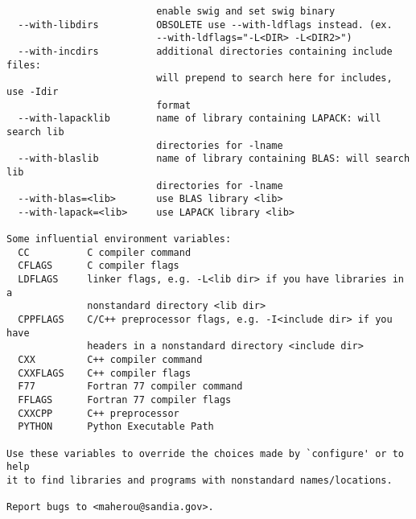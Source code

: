 \begin{verbatim}
                          enable swig and set swig binary
  --with-libdirs          OBSOLETE use --with-ldflags instead. (ex.
                          --with-ldflags="-L<DIR> -L<DIR2>")
  --with-incdirs          additional directories containing include files:
                          will prepend to search here for includes, use -Idir
                          format
  --with-lapacklib        name of library containing LAPACK: will search lib
                          directories for -lname
  --with-blaslib          name of library containing BLAS: will search lib
                          directories for -lname
  --with-blas=<lib>       use BLAS library <lib>
  --with-lapack=<lib>     use LAPACK library <lib>

Some influential environment variables:
  CC          C compiler command
  CFLAGS      C compiler flags
  LDFLAGS     linker flags, e.g. -L<lib dir> if you have libraries in a
              nonstandard directory <lib dir>
  CPPFLAGS    C/C++ preprocessor flags, e.g. -I<include dir> if you have
              headers in a nonstandard directory <include dir>
  CXX         C++ compiler command
  CXXFLAGS    C++ compiler flags
  F77         Fortran 77 compiler command
  FFLAGS      Fortran 77 compiler flags
  CXXCPP      C++ preprocessor
  PYTHON      Python Executable Path

Use these variables to override the choices made by `configure' or to help
it to find libraries and programs with nonstandard names/locations.

Report bugs to <maherou@sandia.gov>.
\end{verbatim}
